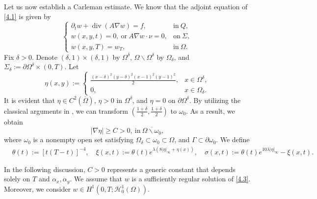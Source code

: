 \documentclass[9pt,reqno]{amsart}
\theoremstyle{plain}
\numberwithin{equation}{section}
\numberwithin{theorem}{section}
\DeclareMathOperator*{\Div}{\mathrm{div}}
\begin{document}
	Let us now establish a Carleman estimate. We know that the adjoint equation of \eqref{4.1} is given by
	\begin{equation}\label{4.3}
		\begin{cases}
			\partial_{t}w + \Div(A\nabla w)=f, & \mbox{in} \ Q,  \\
			w(x,y,t)=0, \ \mbox{or} \ A\nabla w \cdot \nu =0, & \mbox{on} \ \Sigma,  \\
			w(x,  y,  T)= w_T,  & \mbox{in} \ \Omega.  
		\end{cases}
	\end{equation} 
	Fix $\delta>0$. Denote $(\delta,1)\times(\delta,1)$ by $\Omega^\delta$, $\Omega\backslash \Omega^\delta$ by $\Omega_\delta$, and $\Sigma_\delta:= \partial \Omega^\delta \times(0,T)$. Let
	\begin{equation*}
		\eta(x,y) :=
		\begin{cases}
			\frac{(x-\delta)^2 (y-\delta)^2 (x-1)^2(y-1)^2}{2}, & x \in \Omega^\delta,\\
			0, & x \in \Omega_\delta.
		\end{cases}
	\end{equation*}
	It is evident that $\eta \in C^2(\overline{\Omega})$, $\eta > 0$ in $\Omega^\delta$, and $\eta = 0$ on $\partial\Omega^\delta$. By utilizing the classical arguments in \cite{CA6}, we can transform $(\frac{1+\delta}{2},\frac{1+\delta}{2})$ to $\omega_0$. As a result, we obtain
	\begin{equation*}
		\left| \nabla \eta\right| \ge C > 0, \ \mbox{in} \ \overline{\Omega \backslash \omega_0},
	\end{equation*}
	where $\omega_0$ is a nonempty open set satisfying $\Omega_\delta \subset \omega_0 \subset \Omega$, and $\Gamma \subset \partial\omega_0$. We define
	\begin{equation*}
		\begin{split}
			& \theta(t):=[t(T-t)]^{-4}, \quad \xi(x, t):=\theta(t) e^{ \lambda(8|\eta|_\infty+\eta (x))}, \quad \sigma(x, t):=\theta(t) e^{10 \lambda|\eta|_\infty}-\xi(x, t).
		\end{split}
	\end{equation*}
	
	In the following discussion, $C>0$ represents a generic constant that depends solely on $T$ and $\alpha_x, \alpha_y$. We assume that $w$ is a sufficiently regular solution of \eqref{4.3}. Moreover, we consider $w \in H^1(0,T; \mathcal{H}_0^1(\Omega))$.
	
\end{document}
